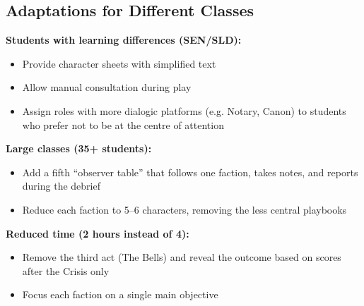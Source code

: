\subsection{Adaptations for Different Classes}

\textbf{Students with learning differences (SEN/SLD):}
\begin{itemize}[nosep]
  \item Provide character sheets with simplified text
  \item Allow manual consultation during play
  \item Assign roles with more dialogic platforms (e.g. Notary, Canon)
    to students who prefer not to be at the centre of attention
\end{itemize}

\textbf{Large classes (35+ students):}
\begin{itemize}[nosep]
  \item Add a fifth ``observer table'' that follows one faction,
    takes notes, and reports during the debrief
  \item Reduce each faction to 5--6 characters, removing the less
    central playbooks
\end{itemize}

\textbf{Reduced time (2 hours instead of 4):}
\begin{itemize}[nosep]
  \item Remove the third act (The Bells) and reveal the outcome based
    on scores after the Crisis only
  \item Focus each faction on a single main objective
\end{itemize}

\filettodoppio
